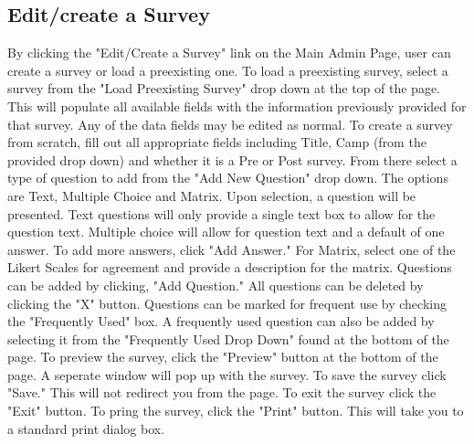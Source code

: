 \documentclass[letterpaper,10pt,serif, draftclsnofoot,onecolumn, compsoc, titlepage]{IEEEtran}
\begin{document}
\subsection{Edit/create a Survey}
By clicking the "Edit/Create a Survey" link on the Main Admin Page, user can create a survey or load a preexisting one.
To load a preexisting survey, select a survey from the "Load Preexisting Survey" drop down at the top of the page.
This will populate all available fields with the information previously provided for that survey.
Any of the data fields may be edited as normal. To create a survey from scratch, fill out all appropriate fields including Title, Camp (from the provided drop down) and whether it is a Pre or Post survey.
From there select a type of question to add from the "Add New Question" drop down. The options are Text, Multiple Choice and Matrix.
Upon selection, a question will  be presented.
Text questions will only provide a single text box to allow for the question text.
Multiple choice will allow for question text and a default of one answer.
To add more answers, click "Add Answer."
For Matrix, select one of the Likert Scales for agreement and provide a description for the matrix.
Questions can be added by clicking, "Add Question."
All questions can be deleted by clicking the "X" button.
Questions can be marked for frequent use by checking the "Frequently Used" box.
A frequently used question can also be added by selecting it from the "Frequently Used Drop Down" found at the bottom of the page.
To preview the survey, click the "Preview" button at the bottom of the page. 
A seperate window will pop up with the survey.
To save the survey click "Save." This will not redirect you from the page.
To exit the survey click the "Exit" button. To pring the survey, click the "Print" button.
This will take you to a standard print dialog box. 
\end{document}
